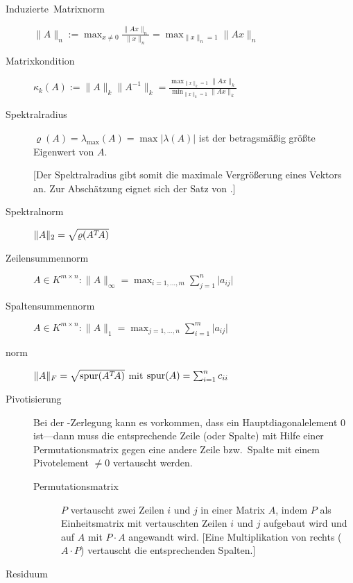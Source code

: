 \begin{description}
  \item [{Induzierte~Matrixnorm}] 
	$\lVert A \rVert_n := \max_{x\neq0}\frac{\lVert Ax \rVert_n}{\lVert x \rVert_n} = \max_{\lVert x \rVert_n=1} \lVert Ax \rVert_n$
  \item [{Matrixkondition}]
	$\kappa_{k}(A) := \lVert A \rVert_k \lVert A^{-1} \rVert_k = \frac{\max_{\lVert x \rVert_k = 1} \lVert Ax \rVert_k}{\min_{\lVert x \rVert_k = 1}\lVert Ax \rVert_k}$
  \item [{Spektralradius}] 
	$\varrho(A)=\lambda_{\max}(A)=\max\left|\lambda(A)\right|$ ist der betragsmäßig größte Eigenwert von $A$.

	[Der Spektralradius gibt somit die maximale Vergrößerung eines Vektors an. Zur Abschätzung eignet sich der Satz von  .]
  \item [{Spektralnorm}] 
	$\lVert A \rVert_2 = \sqrt{\varrho(A\T A)}$
  \item [{Zeilensummennorm}] 
	$A\in K^{m\times n}:\lVert A \rVert_\infty = \max_{i=1,\ldots,m}\sum_{j=1}^{n} \lvert a_{ij} \rvert$
  \item [{Spaltensummennorm}] 
	$A\in K^{m\times n}:\lVert A \rVert_1 = \max_{j=1,\ldots,n}\sum_{i=1}^{m} \lvert a_{ij} \rvert$
  \item [{norm}] 
	$\lVert A \rVert_F = \sqrt{\spur(A\T A)}$ mit $\operatorname{spur}(A)=\sum_{i=1}^{n}c_{ii}$
  \item [{Pivotisierung}] 
	Bei der -Zerlegung kann es vorkommen, dass ein Hauptdiagonalelement 0 ist---dann muss die entsprechende Zeile (oder Spalte) mit Hilfe einer Permutationsmatrix gegen eine andere Zeile bzw.~Spalte mit einem Pivotelement $\neq0$ vertauscht werden.
	\begin{description}
	  \item [{Permutationsmatrix}] 
		$P$ vertauscht zwei Zeilen $i$ und $j$ in einer Matrix $A$, indem $P$ als Einheitsmatrix mit vertauschten Zeilen $i$ und $j$ aufgebaut wird und auf $A$ mit $P\cdot A$ angewandt wird.
		[Eine Multiplikation von rechts ($A\cdot P$) vertauscht die entsprechenden Spalten.]
	\end{description}
  \item [{Residuum}]

\end{description}
